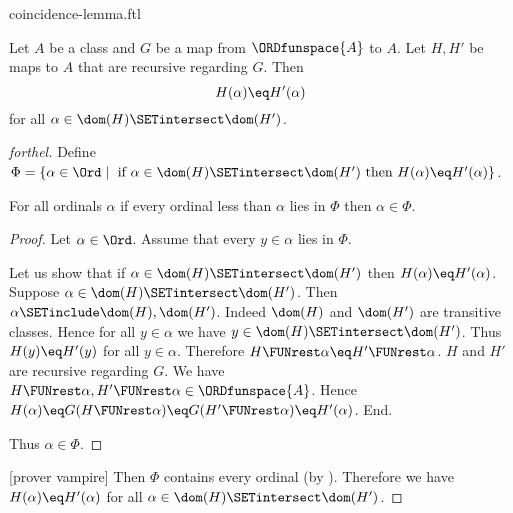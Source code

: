 \documentclass{naproche-library}
\begin{document}
\begin{smodule}[title=The Coincidence Lemma]{coincidence-lemma.ftl}
  
\begin{lemma}[forthel,title=Coincidence Lemma,id=transfinite-recursion_coincidence]
  Let $A$ be a class and $G$ be a map from $\ORDfunspace{A}$ to $A$.
  Let $H, H'$ be maps to $A$ that are recursive regarding $G$.
  Then \[ H(\alpha) \eq H'(\alpha) \] for all $\alpha \in \dom(H) \SETintersect \dom(H')$.
\end{lemma}
\begin{proof}[forthel]
  Define $\Phi = \{ \alpha \in \Ord \mid\text{ if }
  \alpha \in \dom(H) \SETintersect \dom(H')\text{ then }H(\alpha) \eq H'(\alpha) \}$.

  For all ordinals $\alpha$ if every ordinal less than $\alpha$ lies in $\Phi$ then $\alpha \in \Phi$.
  \begin{proof}
    Let $\alpha \in \Ord$.
    Assume that every $y \in \alpha$ lies in $\Phi$.

    Let us show that if $\alpha \in \dom(H) \SETintersect \dom(H')$ then
    $H(\alpha) \eq H'(\alpha)$.
      Suppose $\alpha \in \dom(H) \SETintersect \dom(H')$.
      Then $\alpha \SETinclude \dom(H), \dom(H')$.
      Indeed $\dom(H)$ and $\dom(H')$ are transitive classes.
      Hence for all $y \in \alpha$ we have $y \in \dom(H) \SETintersect \dom(H')$.
      Thus $H(y) \eq H'(y)$ for all $y \in \alpha$.
      Therefore $H \FUNrest \alpha \eq H' \FUNrest \alpha$.
      $H$ and $H'$ are recursive regarding $G$.
      We have $H \FUNrest \alpha, H' \FUNrest \alpha \in \ORDfunspace{A}$.
      Hence $H(\alpha)
        \eq G(H \FUNrest \alpha)
        \eq G(H' \FUNrest \alpha)
        \eq H'(\alpha)$.
    End.

    Thus $\alpha \in \Phi$.
  \end{proof}

  [prover vampire]
  Then $\Phi$ contains every ordinal (by ).
  Therefore we have $H(\alpha) \eq H'(\alpha)$ for all $\alpha \in \dom(H) \SETintersect \dom(H')$.
\end{proof}
\end{smodule}
\end{document}
